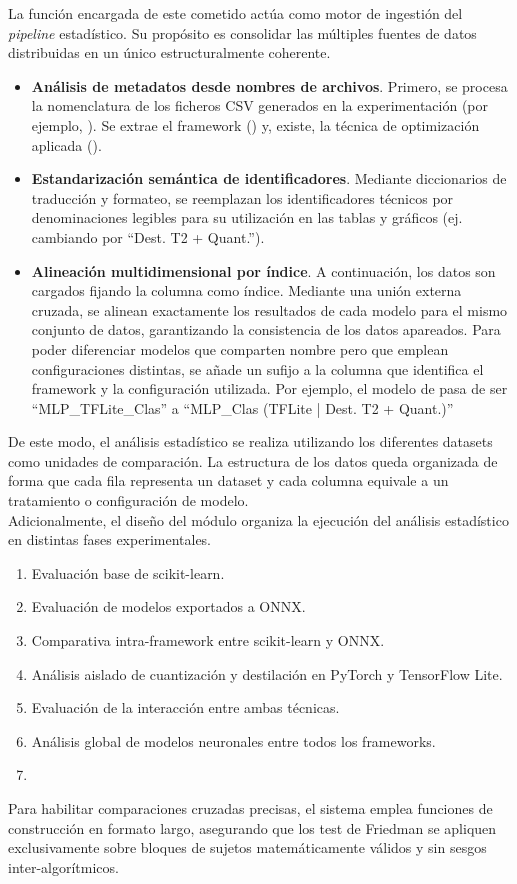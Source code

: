 \documentclass[a4paper,12pt,twoside,final]{book}
\begin{document}
La función encargada de este cometido actúa como motor de ingestión del \textit{pipeline} estadístico. Su propósito es
consolidar las múltiples fuentes de datos distribuidas en un único  estructuralmente coherente.
\begin{itemize}
  \item \textbf{Análisis de metadatos desde nombres de archivos}. Primero, se procesa la nomenclatura de los ficheros
  CSV generados en la experimentación (por ejemplo, ). Se
  extrae el framework () y, existe, la técnica de optimización aplicada ().
  \item \textbf{Estandarización semántica de identificadores}. Mediante diccionarios de traducción y formateo, se
  reemplazan los identificadores técnicos por denominaciones legibles para su utilización en las tablas y gráficos (ej.
  cambiando  por ``Dest. T2 + Quant.'').
  \item \textbf{Alineación multidimensional por índice}. A continuación, los datos son cargados fijando la columna
   como índice. Mediante una unión externa cruzada, se alinean exactamente los resultados de cada modelo
  para el mismo conjunto de datos, garantizando la consistencia de los datos apareados. Para poder diferenciar modelos
  que comparten nombre pero que emplean configuraciones distintas, se añade un sufijo a la columna  que
  identifica el framework y la configuración utilizada. Por ejemplo, el modelo de
   pasa de ser ``MLP\_TFLite\_Clas'' a ``MLP\_Clas (TFLite | Dest. T2
  + Quant.)''
\end{itemize}

De este modo, el análisis estadístico se realiza utilizando los diferentes datasets como unidades de comparación. La
estructura de los datos queda organizada de forma que cada fila representa un dataset y cada columna equivale a un
tratamiento o configuración de modelo.\\

Adicionalmente, el diseño del módulo organiza la ejecución del análisis estadístico en distintas fases experimentales.
\begin{enumerate}
    \item Evaluación base de scikit-learn.
    \item Evaluación de modelos exportados a ONNX.
    \item Comparativa intra-framework entre scikit-learn y ONNX.
    \item Análisis aislado de cuantización y destilación en PyTorch y TensorFlow Lite.
    \item Evaluación de la interacción entre ambas técnicas.
    \item Análisis global de modelos neuronales entre todos los frameworks.
    \item 
\end{enumerate}
Para habilitar comparaciones cruzadas precisas, el sistema emplea funciones de construcción en formato largo, asegurando
que los test de Friedman se apliquen exclusivamente sobre bloques de sujetos matemáticamente válidos y sin sesgos
inter-algorítmicos.
\end{document}
